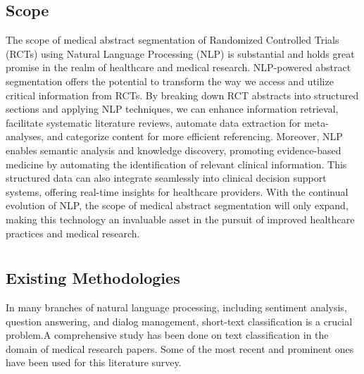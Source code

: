 \documentclass[12pt,a4paper]{report}     %
\begin{document}
\begin{normalsize}
\section {Scope}
{\setlength{\baselineskip}{1.1\baselineskip}
The scope of medical abstract segmentation of Randomized Controlled Trials (RCTs) using Natural Language Processing (NLP) is substantial and holds great promise in the realm of healthcare and medical research. NLP-powered abstract segmentation offers the potential to transform the way we access and utilize critical information from RCTs. By breaking down RCT abstracts into structured sections and applying NLP techniques, we can enhance information retrieval, facilitate systematic literature reviews, automate data extraction for meta-analyses, and categorize content for more efficient referencing. Moreover, NLP enables semantic analysis and knowledge discovery, promoting evidence-based medicine by automating the identification of relevant clinical information. This structured data can also integrate seamlessly into clinical decision support systems, offering real-time insights for healthcare providers. With the continual evolution of NLP, the scope of medical abstract segmentation will only expand, making this technology an invaluable asset in the pursuit of improved healthcare practices and medical research.
}


\newpage 
\chapter{}


{\setlength{\baselineskip}{1.1\baselineskip}
\section{Existing Methodologies}
In many branches of natural language processing, including sentiment analysis, question answering, and dialog management, short-text classification is a crucial problem.A comprehensive study has been done on text classification in the domain of medical research papers. Some of the most recent and prominent ones have been used for this literature survey. 

}
\end{normalsize}
\end{document}
